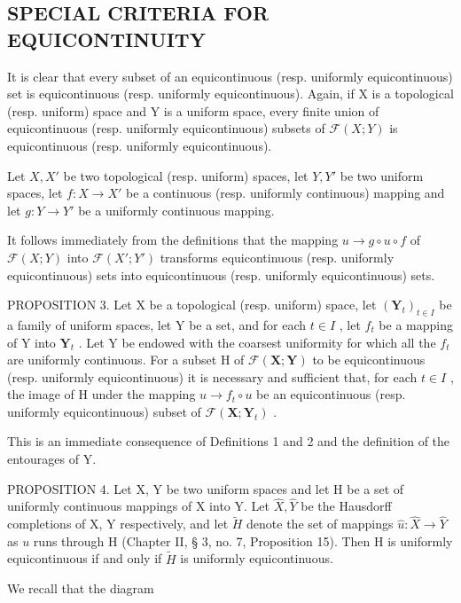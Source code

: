 \subsection{SPECIAL CRITERIA FOR EQUICONTINUITY}

It is clear that every subset of an equicontinuous (resp. uniformly equicontinuous) set is equicontinuous (resp. uniformly equicontinuous). Again, if X is a topological (resp. uniform) space and Y is a uniform space, every finite union of equicontinuous (resp. uniformly equicontinuous) subsets of \(\mathcal{F}(X;Y)\) is equicontinuous (resp. uniformly equicontinuous).

Let \(X, X'\) be two topological (resp. uniform) spaces, let \(Y, Y'\) be two uniform spaces, let \(f: X \to X'\) be a continuous (resp. uniformly continuous) mapping and let \(g: Y \to Y'\) be a uniformly continuous mapping.

It follows immediately from the definitions that the mapping \(u \rightarrow g \circ u \circ f\) of \(\mathcal{F}(X; Y)\) into \(\mathcal{F}(X'; Y')\) transforms equicontinuous (resp. uniformly equicontinuous) sets into equicontinuous (resp. uniformly equicontinuous) sets.

PROPOSITION 3. Let X be a topological (resp. uniform) space, let \((\mathbf{Y}_{t})_{t \in I}\) be a family of uniform spaces, let Y be a set, and for each \(t \in I\) , let \(f_{t}\) be a mapping of Y into \(\mathbf{Y}_{t}\) . Let Y be endowed with the coarsest uniformity for which all the \(f_{t}\) are uniformly continuous. For a subset H of \(\mathcal{F}(\mathbf{X}; \mathbf{Y})\) to be equicontinuous (resp. uniformly equicontinuous) it is necessary and sufficient that, for each \(t \in I\) , the image of H under the mapping \(u \to f_{t} \circ u\) be an equicontinuous (resp. uniformly equicontinuous) subset of \(\mathcal{F}(\mathbf{X}; \mathbf{Y}_{t})\) .

This is an immediate consequence of Definitions 1 and 2 and the definition of the entourages of Y.

PROPOSITION 4. Let X, Y be two uniform spaces and let H be a set of uniformly continuous mappings of X into Y. Let \(\hat{X}, \hat{Y}\) be the Hausdorff completions of X, Y respectively, and let \(\tilde{H}\) denote the set of mappings \(\hat{u}: \hat{X} \to \hat{Y}\) as \(u\) runs through H (Chapter II, § 3, no. 7, Proposition 15). Then H is uniformly equicontinuous if and only if \(\tilde{H}\) is uniformly equicontinuous.

We recall that the diagram


